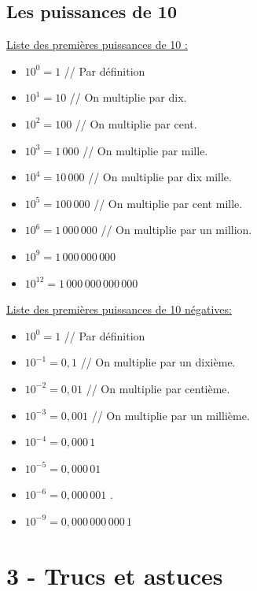 \documentclass[12pt]{article}
\begin{document}
  \subsection*{Les puissances de 10}
\begin{multicols}{2}

  \underline{Liste des premières puissances de 10 :} 

  \begin{itemize}
  \item $10^0 = 1 $ // Par définition 
  \item $10^1 = 10$ // On multiplie par dix.
  \item $10^2 = 100$ // On multiplie par cent.
  \item $10^3 = 1 \, 000$ // On multiplie par mille.
  \item $10^4 = 10 \, 000$ // On multiplie par dix mille.
  \item $10^5 = 100 \, 000$ // On multiplie par cent mille.
  \item $10^6 = 1 \, 000\, 000$ // On multiplie par un million.
  \item $10^9 = 1 \, 000\, 000 \, 000$ 
  \item $10^{12} =1 \, 000 \, 000 \, 000 \, 000$
  \end{itemize}

  \underline{Liste des premières puissances de 10 négatives:} 

  \begin{itemize}
  \item $10^0 = 1 $ // Par définition 
  \item $10^{-1} = 0,1$ // On multiplie par un dixième.
  \item $10^{-2} = 0,01$ // On multiplie par centième.
  \item $10^{-3} = 0,001$ // On multiplie par un millième.
  \item $10^{-4} = 0,000 \, 1$ 
  \item $10^{-5} = 0,000 \, 01$ 
  \item $10^{-6} = 0,000 \, 001$ .
  \item $10^{-9} = 0,000 \, 000 \, 000 \, 1$ 
  \end{itemize}
\end{multicols}

\newpage

\section*{3 - Trucs et astuces}
\end{document}
